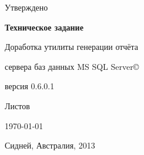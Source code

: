 \begin{titlepage}

\begin{center}

	\Large{Утверждено}

\end{center}

\hrulefill

\vspace{8em}

\begin{center}

	\Large{\textbf{Техническое задание}}

\end{center}

\vspace{6em}

\begin{center}

	\Large{Доработка утилиты генерации отчёта}

	\vspace{1.5em}

	\Large{сервера баз данных MS SQL Server{\copyright}}

	\vspace{2.5em}

	\Large{версия 0.6.0.1}

\end{center}

\vspace{6em}

\vspace{\fill}

\begin{center}

	\Large{Листов \pageref{LastPage}}

\end{center}

\vspace{6em}

\hrulefill

\begin{center}

	\Large{\today}

	\vspace{1.5em}

	\Large{Сидней, Австралия, 2013}

\end{center}

\end{titlepage}

